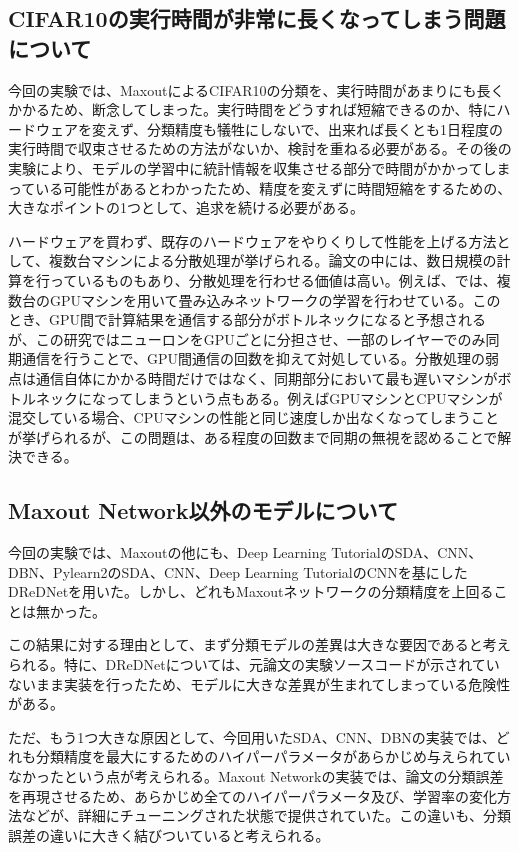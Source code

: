 \subsection{CIFAR10の実行時間が非常に長くなってしまう問題について}
今回の実験では、MaxoutによるCIFAR10の分類を、実行時間があまりにも長くかかるため、断念してしまった。実行時間をどうすれば短縮できるのか、特にハードウェアを変えず、分類精度も犠牲にしないで、出来れば長くとも1日程度の実行時間で収束させるための方法がないか、検討を重ねる必要がある。その後の実験により、モデルの学習中に統計情報を収集させる部分で時間がかかってしまっている可能性があるとわかったため、精度を変えずに時間短縮をするための、大きなポイントの1つとして、追求を続ける必要がある。\par
ハードウェアを買わず、既存のハードウェアをやりくりして性能を上げる方法として、複数台マシンによる分散処理が挙げられる。論文の中には、数日規模の計算を行っているものもあり、分散処理を行わせる価値は高い。例えば、\cite{krizhevsky2012imagenet}では、複数台のGPUマシンを用いて畳み込みネットワークの学習を行わせている。このとき、GPU間で計算結果を通信する部分がボトルネックになると予想されるが、この研究ではニューロンをGPUごとに分担させ、一部のレイヤーでのみ同期通信を行うことで、GPU間通信の回数を抑えて対処している。分散処理の弱点は通信自体にかかる時間だけではなく、同期部分において最も遅いマシンがボトルネックになってしまうという点もある。例えばGPUマシンとCPUマシンが混交している場合、CPUマシンの性能と同じ速度しか出なくなってしまうことが挙げられるが、この問題は、ある程度の回数まで同期の無視を認めることで解決できる\cite{ho2013more}。

\subsection{Maxout Network以外のモデルについて}
今回の実験では、Maxoutの他にも、Deep Learning TutorialのSDA、CNN、DBN、Pylearn2のSDA、CNN、Deep Learning TutorialのCNNを基にしたDReDNetを用いた。しかし、どれもMaxoutネットワークの分類精度を上回ることは無かった。\par
この結果に対する理由として、まず分類モデルの差異は大きな要因であると考えられる。特に、DReDNetについては、元論文の実験ソースコードが示されていないまま実装を行ったため、モデルに大きな差異が生まれてしまっている危険性がある。\par
ただ、もう1つ大きな原因として、今回用いたSDA、CNN、DBNの実装では、どれも分類精度を最大にするためのハイパーパラメータがあらかじめ与えられていなかったという点が考えられる。Maxout Networkの実装では、論文の分類誤差を再現させるため、あらかじめ全てのハイパーパラメータ及び、学習率の変化方法などが、詳細にチューニングされた状態で提供されていた。この違いも、分類誤差の違いに大きく結びついていると考えられる。

